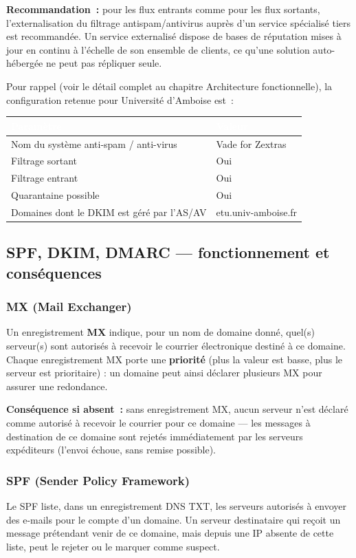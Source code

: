 \documentclass[11pt,a4paper]{report}
\newcommand{\tblhead}[1]{\textcolor{white}{\textbf{#1}}}
\begin{document}
\textbf{Recommandation~:} pour les flux entrants comme pour les flux sortants, l'externalisation du filtrage antispam/antivirus auprès d'un service spécialisé tiers est recommandée. Un service externalisé dispose de bases de réputation mises à jour en continu à l'échelle de son ensemble de clients, ce qu'une solution auto-hébergée ne peut pas répliquer seule.

Pour rappel (voir le détail complet au chapitre Architecture fonctionnelle), la configuration retenue pour Université d'Amboise est~:
\begin{longtable}{|p{7cm}|p{6cm}|}
\hline
\rowcolor{primary}\tblhead{Paramètre} & \tblhead{Valeur} \\
\hline
\endhead
Nom du système anti-spam / anti-virus & Vade for Zextras \\
\hline
Filtrage sortant & Oui \\
\hline
Filtrage entrant & Oui \\
\hline
Quarantaine possible & Oui \\
\hline
Domaines dont le DKIM est géré par l'AS/AV & etu.\allowbreak{}univ-\allowbreak{}amboise.\allowbreak{}fr \\
\hline
\end{longtable}

\subsection{SPF, DKIM, DMARC --- fonctionnement et conséquences}
\label{sec:dns-consequences}

\subsubsection{MX (Mail Exchanger)}
Un enregistrement \textbf{MX} indique, pour un nom de domaine donné, quel(s) serveur(s) sont autorisés à recevoir le courrier électronique destiné à ce domaine. Chaque enregistrement MX porte une \textbf{priorité} (plus la valeur est basse, plus le serveur est prioritaire) : un domaine peut ainsi déclarer plusieurs MX pour assurer une redondance.

\textbf{Conséquence si absent~:} sans enregistrement MX, aucun serveur n'est déclaré comme autorisé à recevoir le courrier pour ce domaine --- les messages à destination de ce domaine sont rejetés immédiatement par les serveurs expéditeurs (l'envoi échoue, sans remise possible).

\subsubsection{SPF (Sender Policy Framework)}
Le SPF liste, dans un enregistrement DNS TXT, les serveurs autorisés à envoyer des e-mails pour le compte d'un domaine. Un serveur destinataire qui reçoit un message prétendant venir de ce domaine, mais depuis une IP absente de cette liste, peut le rejeter ou le marquer comme suspect.
\end{document}
